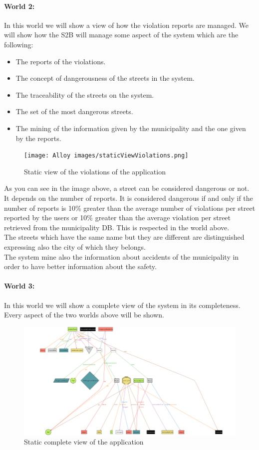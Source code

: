 \documentclass[titlepage]{article}
\begin{document}
\paragraph{World 2:}
In this world we will show a view of how the violation reports are managed. We will show how the S2B will manage some aspect of the system which are the following:
\begin{itemize}
	\item The reports of the violations.
	\item The concept of dangerousness of the streets in the system.
	\item The traceability of the streets on the system.
	\item The set of the most dangerous streets.
	\item The mining of the information given by the 		
	municipality and the one given by the reports.
\end{itemize}
\begin{figure}[h]
	\texttt{[image: Alloy images/staticViewViolations.png]}
	\centering
	\caption{Static view of the violations of the application}
\end{figure}
\FloatBarrier
As you can see in the image above, a street can be considered dangerous or not. It depends on the number of reports. It is considered dangerous if and only if the number of reports is 10\% greater than the average number of violations per street reported by the users or 10\% greater than the average violation per street retrieved from the municipality DB. This is respected in the world above.\\
The streets which have the same name but they are different are distinguished expressing also the city of which they belongs.\\
The system mine also the information about accidents of the municipality in order to have better information about the safety.
\paragraph{World 3:}
In this world we will show a complete view of the system in its completeness. Every aspect of the two worlds above will be shown.

\begin{figure}[h]
	\includegraphics[scale=1.1,angle=90]{Alloy images/staticCompleteView.png}
	\centering
	\caption{Static complete view of the application}
\end{figure}
\FloatBarrier
\end{document}
